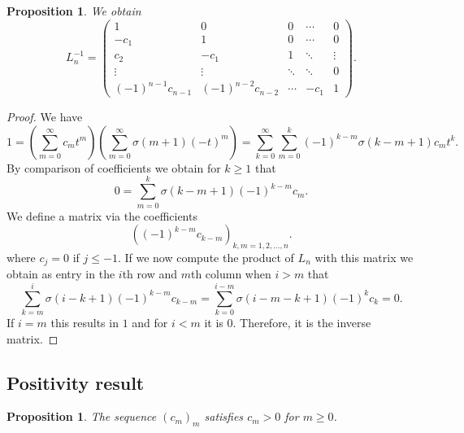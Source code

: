 \documentclass[11pt,reqno]{amsart}
\theoremstyle{plain}
\newtheorem{proposition}[theorem]{Proposition}
\theoremstyle{remark}
\theoremstyle{definition}
\numberwithin{equation}{section}
\begin{document}
\begin{proposition}
We obtain
\[
L_n^{-1}=
\begin{pmatrix}
1 & 0 & 0 & \cdots & 0 \\
-c_1 & 1 & 0 & \cdots & 0 \\
c_2 & -c_1 & 1 & \ddots & \vdots \\
\vdots & \vdots & \ddots & \ddots & 0 \\
(-1)^{n-1}c_{n-1} & (-1)^{n-2}c_{n-2} & \cdots & -c_1 & 1
\end{pmatrix}.
\]
\end{proposition}




\begin{proof}
We have
\[
1
=
\left( \sum _{m=0}^{\infty }c_{m}t^{m}\right)
\left( \sum _{m=0}^{\infty }\sigma \left( m+1\right) \left( -t\right) ^{m}\right)
=
\sum _{k=0}^{\infty }\sum _{m=0}^{k}\left( -1\right) ^{k-m}\sigma \left(
k-m+1\right) c_{m}t^{k}
.
\]
By comparison of coefficients we obtain for $k\geq 1$ that
\[
0=
\sum _{m=0}^{k}\sigma \left( k-m+1\right)
\left( -1\right) ^{k-m}c_{m}
.
\]
We define a
matrix via the coefficients
$$\left( \left( -1\right) ^{k
-m}c_{k-m}\right) _{k,m=1,2,\ldots ,n}.$$
where $c_{j}=0$ if $j\leq -1$. If we now compute the product of $L_{n}$ with
this matrix we obtain as entry in the $i$th row and $m$th column when $i>m$
that
$$\sum _{k=m}^{i}\sigma \left( i-k+1\right) \left( -1\right) ^{k
-m}c_{k-m}
=\sum _{k=0}^{i-m}\sigma \left( i-m-k+1\right) \left( -1\right) ^{k
}c_{k
}=0.$$
If $i=m$ this results in $1$ and for $i<m$ it is $0$. Therefore, it is the
inverse matrix. 
\end{proof}
\subsection{Positivity result}
\begin{proposition}
\label{prop:pos}The sequence $\left(
c_m\right)
_m$ 
satisfies $c_m >0$ for $m \geq 0$.
\end{proposition}
\end{document}
